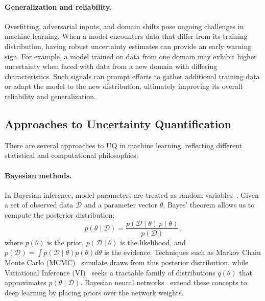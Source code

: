 \paragraph{Generalization and reliability.} Overfitting, adversarial inputs, and domain shifts pose ongoing challenges in machine learning. When a model encounters data that differ from its training distribution, having robust uncertainty estimates can provide an early warning sign. For example, a model trained on data from one domain may exhibit higher uncertainty when faced with data from a new domain with differing characteristics. Such signals can prompt efforts to gather additional training data or adapt the model to the new distribution, ultimately improving its overall reliability and generalization.

\subsection{Approaches to Uncertainty Quantification}
There are several approaches to UQ in machine learning, reflecting different statistical and computational philosophies:

\paragraph{Bayesian methods.}
In Bayesian inference, model parameters are treated as random variables~\citep{bishop2006pattern}. Given a set of observed data $\mathcal{D}$ and a parameter vector $\theta$, Bayes' theorem allows us to compute the posterior distribution:
\begin{equation}
p(\theta \mid \mathcal{D}) = \frac{p(\mathcal{D} \mid \theta) \, p(\theta)}{p(\mathcal{D})},
\end{equation}
where $p(\theta)$ is the prior, $p(\mathcal{D} \mid \theta)$ is the likelihood, and $p(\mathcal{D}) = \int p(\mathcal{D} \mid \theta)p(\theta)d\theta$ is the evidence. Techniques such as Markov Chain Monte Carlo (MCMC)~\citep{geyer1992practical} simulate draws from this posterior distribution, while Variational Inference (VI)~\citep{blei2017variational} seeks a tractable family of distributions $q(\theta)$ that approximates $p(\theta \mid \mathcal{D})$. Bayesian neural networks~\citep{blundell2015weight} extend these concepts to deep learning by placing priors over the network weights.


